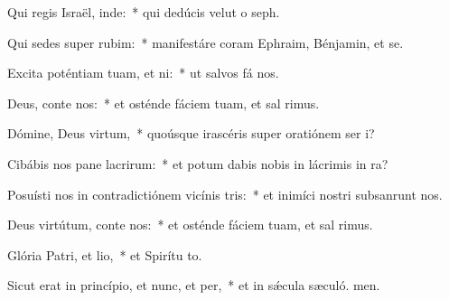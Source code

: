 \item Qui regis Israël, inde:~* qui dedúcis velut o seph.
\item Qui sedes super rubim:~* manifestáre coram Ephraim, Bénjamin, et se.
\item Excita poténtiam tuam, et ni:~* ut salvos fá nos.
\item Deus, conte nos:~* et osténde fáciem tuam, et sal rimus.
\item Dómine, Deus virtum,~* quoúsque irascéris super oratiónem ser i?
\item Cibábis nos pane lacrirum:~* et potum dabis nobis in lácrimis in ra?
\item Posuísti nos in contradictiónem vicínis tris:~* et inimíci nostri subsanrunt nos.
\item Deus virtútum, conte nos:~* et osténde fáciem tuam, et sal rimus.
\item Glória Patri, et lio,~* et Spirítu to.
\item Sicut erat in princípio, et nunc, et per,~* et in sǽcula sæculó. men.
